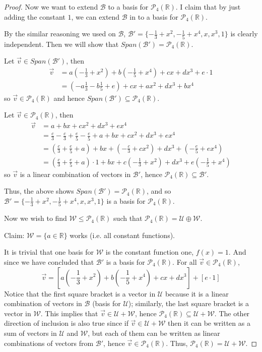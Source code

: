 \documentclass{article}
\begin{document}
\begin{proof}
Now we want to extend $\mathcal{B}$ to a basis for $\mathcal{P}_4(\mathbb{R})$. I claim that by just adding the constant $1$, we can extend $\mathcal{B}$ in to a basis for $\mathcal{P}_4(\mathbb{R})$. 

By the similar reasoning we used on $\mathcal{B}$, $\mathcal{B'} = \{ -\frac{1}{3}+x^2, -\frac{1}{5}+x^4 , x, x^3 , 1\}$ is clearly independent. Then we will show that $Span(\mathcal{B'}) = \mathcal{P}_4(\mathbb{R})$.

Let $\vec{v} \in Span(\mathcal{B'})$, then 
\begin{align*}
\vec{v} &= a(-\frac{1}{3}+x^2)+b(-\frac{1}{5}+x^4)+ cx+dx^3+e \cdot 1 \\
&= (-a\frac{1}{3} -b\frac{1}{5} +e) + cx +ax^2+dx^3+bx^4
\end{align*}
so $\vec{v} \in \mathcal{P}_4(\mathbb{R})$ and hence $Span(\mathcal{B'}) \subseteq \mathcal{P}_4(\mathbb{R})$.

Let $\vec{v} \in \mathcal{P}_4(\mathbb{R})$, then 
\begin{align*}
\vec{v} &= a+bx+cx^2+dx^3+ex^4 \\
&= \frac{c}{3} -\frac{c}{3} +\frac{e}{5} -\frac{e}{5} + a+bx+cx^2+dx^3+ex^4 \\
&= (\frac{c}{3} + \frac{e}{5} +a) + bx + (-\frac{c}{3} + cx^2) +dx^3+(-\frac{e}{5}+ex^4) \\
&= (\frac{c}{3} + \frac{e}{5} +a) \cdot 1 + b  x + c  (-\frac{1}{3} + x^2) + d  x^3 + e  (-\frac{1}{5}+x^4)
\end{align*}
so $\vec{v}$ is a linear combination of vectors in $\mathcal{B'}$, hence $\mathcal{P}_4(\mathbb{R}) \subseteq \mathcal{B'}$.

Thus, the above shows $Span(\mathcal{B'}) = \mathcal{P}_4(\mathbb{R})$, and so $\mathcal{B'} = \{ -\frac{1}{3}+x^2, -\frac{1}{5}+x^4 , x, x^3 , 1\}$ is a basis for $\mathcal{P}_4(\mathbb{R})$.
\bigskip

Now we wish to find $\mathcal{W} \le \mathcal{P}_4(\mathbb{R})$ such that $\mathcal{P}_4(\mathbb{R}) = \mathcal{U} \oplus \mathcal{W}$.

Claim: $\mathcal{W} = \{a \in \mathbb{R} \}$ works (i.e. all constant functions).

It is trivial that one basis for $\mathcal{W}$ is the constant function one, $f(x)=1$. And since we have concluded that $\mathcal{B'}$ is a basis for $\mathcal{P}_4(\mathbb{R})$. For all $\vec{v} \in \mathcal{P}_4(\mathbb{R})$,
$$
\vec{v} = [a(-\frac{1}{3}+x^2) + b (-\frac{1}{5}+x^4) + cx+dx^3]+[e \cdot 1] 
$$
Notice that the first square bracket is a vector in $\mathcal{U}$ because it is a linear combination of vectors in $\mathcal{B}$ (basis for $\mathcal{U}$); similarly, the last square bracket is a vector in $\mathcal{W}$. This implies that $\vec{v} \in \mathcal{U} + \mathcal{W}$, hence $\mathcal{P}_4(\mathbb{R}) \subseteq \mathcal{U} + \mathcal{W}$. The other direction of inclusion is also true since if $\vec{v} \in \mathcal{U} + \mathcal{W}$ then it can be written as a sum of vectors in $\mathcal{U}$ and $\mathcal{W}$, but each of them can be written as linear combinations of vectors from $\mathcal{B'}$, hence $\vec{v} \in \mathcal{P}_4(\mathbb{R})$. Thus, $\mathcal{P}_4(\mathbb{R}) = \mathcal{U} + \mathcal{W}$.
\medskip


\end{proof}
\end{document}
